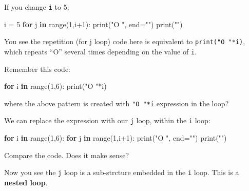 \documentclass[
  letterpaper,
]{scrbook}
\newenvironment{Shaded}{\begin{snugshade}}{\end{snugshade}}
\newcommand{\BuiltInTok}[1]{\textcolor[rgb]{0.00,0.23,0.31}{#1}}
\newcommand{\ControlFlowTok}[1]{\textcolor[rgb]{0.00,0.23,0.31}{\textbf{#1}}}
\newcommand{\DecValTok}[1]{\textcolor[rgb]{0.68,0.00,0.00}{#1}}
\newcommand{\KeywordTok}[1]{\textcolor[rgb]{0.00,0.23,0.31}{\textbf{#1}}}
\newcommand{\NormalTok}[1]{\textcolor[rgb]{0.00,0.23,0.31}{#1}}
\newcommand{\OperatorTok}[1]{\textcolor[rgb]{0.37,0.37,0.37}{#1}}
\newcommand{\StringTok}[1]{\textcolor[rgb]{0.13,0.47,0.30}{#1}}
\begin{document}
If you change \texttt{i} to 5:

\begin{Shaded}
\begin{Highlighting}[]
\NormalTok{i }\OperatorTok{=} \DecValTok{5}
\ControlFlowTok{for}\NormalTok{ j }\KeywordTok{in} \BuiltInTok{range}\NormalTok{(}\DecValTok{1}\NormalTok{,i}\OperatorTok{+}\DecValTok{1}\NormalTok{):}
    \BuiltInTok{print}\NormalTok{(}\StringTok{"O "}\NormalTok{, end}\OperatorTok{=}\StringTok{""}\NormalTok{)}
\BuiltInTok{print}\NormalTok{(}\StringTok{""}\NormalTok{)}
\end{Highlighting}
\end{Shaded}

You see the repetition (for j loop) code here is equivalent to
\texttt{print("O\ "*i)}, which repeats ``O'' several times depending on
the value of \texttt{i}.

Remember this code:

\begin{Shaded}
\begin{Highlighting}[]
\ControlFlowTok{for}\NormalTok{ i }\KeywordTok{in} \BuiltInTok{range}\NormalTok{(}\DecValTok{1}\NormalTok{,}\DecValTok{6}\NormalTok{):}
    \BuiltInTok{print}\NormalTok{(}\StringTok{"O "}\OperatorTok{*}\NormalTok{i)}
\end{Highlighting}
\end{Shaded}

where the above pattern is created with \texttt{"O\ "*i} expression in
the loop?

We can replace the expression with our \texttt{j} loop, within the
\texttt{i} loop:

\begin{Shaded}
\begin{Highlighting}[]
\ControlFlowTok{for}\NormalTok{ i }\KeywordTok{in} \BuiltInTok{range}\NormalTok{(}\DecValTok{1}\NormalTok{,}\DecValTok{6}\NormalTok{):}
    \ControlFlowTok{for}\NormalTok{ j }\KeywordTok{in} \BuiltInTok{range}\NormalTok{(}\DecValTok{1}\NormalTok{,i}\OperatorTok{+}\DecValTok{1}\NormalTok{):}
        \BuiltInTok{print}\NormalTok{(}\StringTok{"O "}\NormalTok{, end}\OperatorTok{=}\StringTok{""}\NormalTok{)}
    \BuiltInTok{print}\NormalTok{(}\StringTok{""}\NormalTok{)}
\end{Highlighting}
\end{Shaded}

Compare the code. Does it make sense?

Now you see the \texttt{j} loop is a sub-strcture embedded in the
\texttt{i} loop. This is a \textbf{nested loop}.
\end{document}
